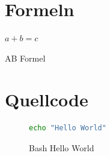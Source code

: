 
\section{Formeln}

\begin{Formel}
$a+b=c$
\caption{AB Formel}
\end{Formel}


\section{Quellcode}
\begin{figure}[H]
\begin{lstlisting}[language=bash]
echo "Hello World"
\end{lstlisting}
\caption{Bash Hello World}
\end{figure}

